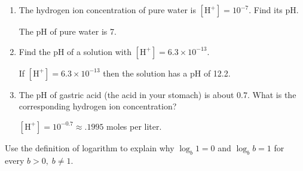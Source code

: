\documentclass{ximera}
\begin{document}
\begin{question}
\begin{problem}
\begin{enumerate}

\item The hydrogen ion concentration of pure water is $[\mbox{H}^{+}] = 10^{-7}$.  Find its pH.

\begin{solution}
The pH of pure water is 7.
\end{solution}

\item Find the pH of a solution with $[\mbox{H}^{+}] = 6.3 \times 10^{-13}$.

\begin{solution}
If $[\mbox{H}^{+}] = 6.3 \times 10^{-13}$ then the solution has a pH of 12.2.
\end{solution}

\item The pH of gastric acid (the acid in your stomach) is about $0.7$.  What is the corresponding hydrogen ion concentration?

\begin{solution}
$[\mbox{H}^{+}] = 10^{-0.7} \approx .1995$ moles per liter.
\end{solution}
\end{enumerate}

\end{problem}

\end{question}

\begin{problem}
Use the definition of logarithm to explain why  $\log_{b} 1 = 0$ and $\log_{b} b = 1$ for every $b > 0, \; b \neq 1$.
\end{problem}
\end{document}

